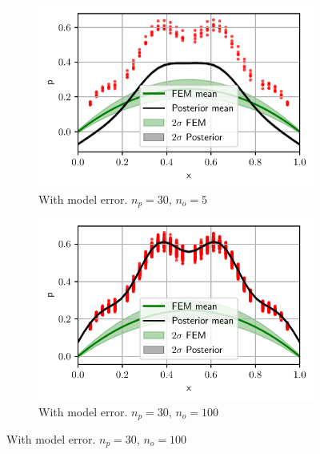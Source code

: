 \documentclass[%
  a4paper,oneside,%
  11pt,%
  smallchapters,
  style=printdev,
  extramargin,
  green,%
  rgb, <cmyk>
  ]{tubsbook}
\begin{document}
\begin{figure}[!ht]
\centering
	\begin{subfigure}[t]{.5\textwidth}
	\centering
	\includegraphics[width=1\linewidth]{../../Python/Results/1D/PriorDataConflict/Model_Error/30s_5o/Result.pdf}
	\caption{With model error. $n_p=30$, $n_o=5$}
		\label{fig:1DConflicta}
	\end{subfigure}%
	\begin{subfigure}[t]{.5\textwidth}
	\centering
	\includegraphics[width=1\linewidth]{../../Python/Results/1D/PriorDataConflict/Model_Error/30s_100o/Result.pdf}
\centering
\caption{With model error. $n_p=30$, $n_o=100$ }
\label{fig:1DConflictb}
	\end{subfigure}
	

\end{figure}
\end{document}
